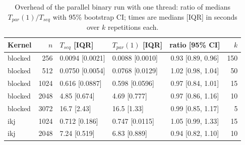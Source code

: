 \begin{table}[t]
\centering
\caption{Overhead of the parallel binary run with one thread: ratio of medians $T_{par}(1)/T_{seq}$ with 95\% bootstrap CI; times are medians [IQR] in seconds over $k$ repetitions each.}
\label{tab:overhead}
\footnotesize
\setlength{\tabcolsep}{2.5pt}
\begin{tabular}{@{}lrllcr@{}}
\toprule
Kernel & $n$ & $T_{seq}$ [IQR] & $T_{par}(1)$ [IQR] & ratio [95\% CI] & $k$ \\
\midrule
blocked & 256 & 0.0094 [0.0021] & 0.0088 [0.0010] & 0.93 [0.89, 0.96] & 150 \\
blocked & 512 & 0.0750 [0.0054] & 0.0768 [0.0129] & 1.02 [0.98, 1.04] & 50 \\
blocked & 1024 & 0.616 [0.0887] & 0.598 [0.0596] & 0.97 [0.84, 1.01] & 15 \\
blocked & 2048 & 4.85 [0.674] & 4.69 [0.777] & 0.97 [0.86, 1.16] & 10 \\
blocked & 3072 & 16.7 [2.43] & 16.5 [1.33] & 0.99 [0.85, 1.17] & 5 \\
ikj & 1024 & 0.712 [0.186] & 0.747 [0.0115] & 1.05 [0.99, 1.33] & 15 \\
ikj & 2048 & 7.24 [0.519] & 6.83 [0.889] & 0.94 [0.82, 1.10] & 10 \\
\bottomrule
\end{tabular}
\end{table}
